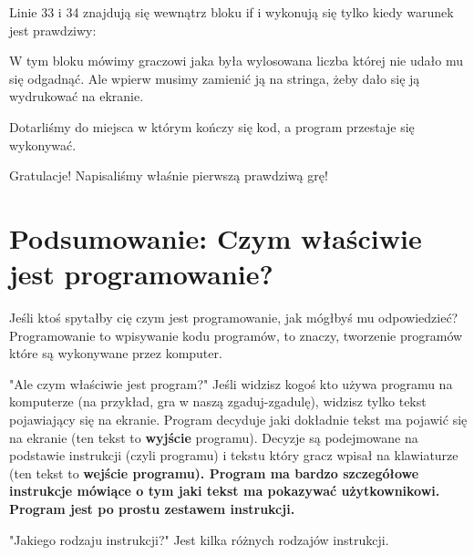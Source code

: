 \documentclass{book}
\begin{document}
Linie 33 i 34 znajdują się wewnątrz bloku if i wykonują się tylko kiedy warunek jest prawdziwy:



W tym bloku mówimy graczowi jaka była wylosowana liczba której nie udało mu się odgadnąć. Ale wpierw musimy zamienić ją na stringa, żeby dało się ją wydrukować na ekranie.

Dotarliśmy do miejsca w którym kończy się kod, a program przestaje się wykonywać.

Gratulacje! Napisaliśmy właśnie pierwszą prawdziwą grę!

\section{Podsumowanie: Czym właściwie jest programowanie?}

Jeśli ktoś spytałby cię czym jest programowanie, jak mógłbyś mu odpowiedzieć? Programowanie to wpisywanie kodu programów, to znaczy, tworzenie programów które są wykonywane przez komputer.

"Ale czym właściwie jest program?" Jeśli widzisz kogoś kto używa programu na komputerze (na przykład, gra w naszą zgaduj-zgadulę), widzisz tylko tekst pojawiający się na ekranie. Program decyduje jaki dokładnie tekst ma pojawić się na ekranie (ten tekst to {\bf wyjście} programu). Decyzje są podejmowane na podstawie instrukcji (czyli programu) i tekstu który gracz wpisał na klawiaturze (ten tekst to \bf{wejście} programu). Program ma bardzo szczegółowe instrukcje mówiące o tym jaki tekst ma pokazywać użytkownikowi. Program jest po prostu zestawem instrukcji.

"Jakiego rodzaju instrukcji?" Jest kilka różnych rodzajów instrukcji.
\end{document}
